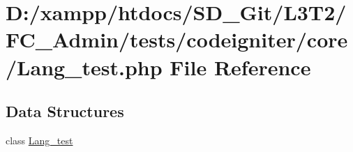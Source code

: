 \hypertarget{_lang__test_8php}{}\section{D\+:/xampp/htdocs/\+S\+D\+\_\+\+Git/\+L3\+T2/\+F\+C\+\_\+\+Admin/tests/codeigniter/core/\+Lang\+\_\+test.php File Reference}
\label{_lang__test_8php}
\subsection*{Data Structures}
\begin{DoxyCompactItemize}
\item 
class \hyperlink{class_lang__test}{Lang\+\_\+test}
\end{DoxyCompactItemize}
